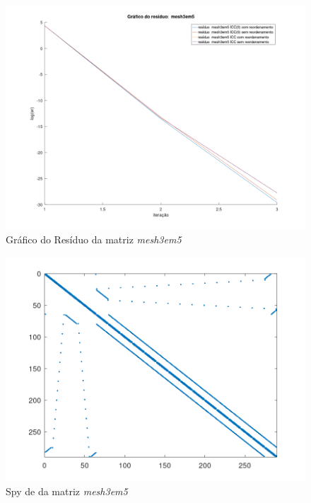 \begin{figure}[H]
    \centering
         \centering
         \includegraphics[width=.6\linewidth]{images/mesh3em5.png}
         \caption{Gráfico do Resíduo da matriz \textit{mesh3em5}}
         \label{fig:mesh-res}
\end{figure}

\begin{figure}[H]
    \centering
         \centering
         \includegraphics[width=.5\linewidth]{images/mesh3em5_spyA.png}
         \caption{Spy de da matriz \textit{mesh3em5}}
         \label{fig:mesh-spy-a}
\end{figure}

